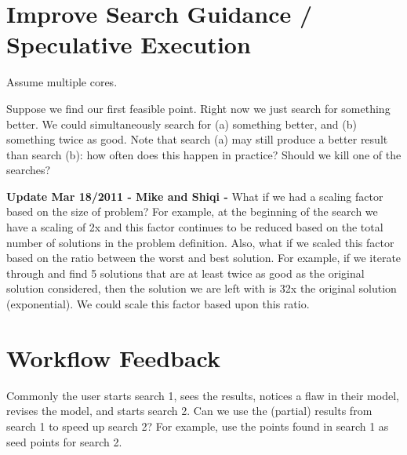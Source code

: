 \documentclass[11pt]{article}
\begin{document}
\section{Improve Search Guidance / Speculative Execution}

Assume multiple cores.

Suppose we find our first feasible point.  Right now we just search
for something better.  We could simultaneously search for (a)
something better, and (b) something twice as good.  Note that search
(a) may still produce a better result than search (b): how often does
this happen in practice?  Should we kill one of the searches?  

{\bf Update Mar 18/2011 - Mike and Shiqi -} What if we had a scaling factor based on the size of problem? 
For example, at the beginning of the search we have a scaling of 2x and this factor continues to be reduced
based on the total number of solutions in the problem definition. Also, what if we scaled this factor based on the ratio
between the worst and best solution. For example, if we iterate through and find 5 solutions that are at least twice as good
as the original solution considered, then the solution we are left with is 32x the original solution (exponential). We could
scale this factor based upon this ratio.



\section{Workflow Feedback}

Commonly the user starts search 1, sees the results, notices a flaw in
their model, revises the model, and starts search 2.  Can we use the
(partial) results from search 1 to speed up search 2?  For example,
use the points found in search 1 as seed points for search 2.


\end{document}
